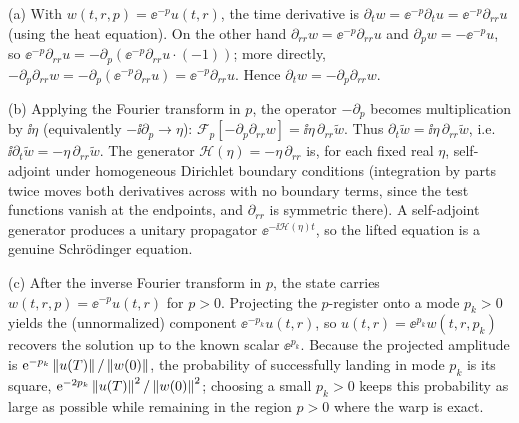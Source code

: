 \begin{solution}
(a) With $w(t,r,p)=\ee^{-p}u(t,r)$, the time derivative is $\partial_t w=\ee^{-p}\partial_t u
=\ee^{-p}\partial_{rr}u$ (using the heat equation). On the other hand $\partial_{rr}w=\ee^{-p}
\partial_{rr}u$ and $\partial_p w=-\ee^{-p}u$, so $\ee^{-p}\partial_{rr}u=-\partial_p(\ee^{-p}
\partial_{rr}u\cdot(-1))$; more directly, $-\partial_p\partial_{rr}w=-\partial_p(\ee^{-p}
\partial_{rr}u)=\ee^{-p}\partial_{rr}u$. Hence $\partial_t w=-\partial_p\partial_{rr}w$.

(b) Applying the Fourier transform in $p$, the operator $-\partial_p$ becomes multiplication by
$\ii\eta$ (equivalently $-\ii\partial_p\to\eta$): $\mathcal F_p[-\partial_p\partial_{rr}w]=
\ii\eta\,\partial_{rr}\tilde w$. Thus $\partial_t\tilde w=\ii\eta\,\partial_{rr}\tilde w$, i.e.\
$\ii\partial_t\tilde w=-\eta\,\partial_{rr}\tilde w$. The generator $\mathcal H(\eta)=-\eta\,
\partial_{rr}$ is, for each fixed real $\eta$, self-adjoint under homogeneous Dirichlet boundary
conditions (integration by parts twice moves both derivatives across with no boundary terms,
since the test functions vanish at the endpoints, and $\partial_{rr}$ is symmetric there). A
self-adjoint generator produces a unitary propagator $\ee^{-\ii\mathcal H(\eta)t}$, so the lifted
equation is a genuine Schr\"odinger equation.

(c) After the inverse Fourier transform in $p$, the state carries $w(t,r,p)=\ee^{-p}u(t,r)$ for
$p>0$. Projecting the $p$-register onto a mode $p_k>0$ yields the (unnormalized) component
$\ee^{-p_k}u(t,r)$, so $u(t,r)=\ee^{p_k}w(t,r,p_k)$ recovers the solution up to the known scalar
$\ee^{p_k}$. Because the projected amplitude is $\mathrm{e}^{-p_k}\left\lVert u(T) \right\rVert/\left\lVert w(0) \right\rVert$, the
probability of successfully landing in mode $p_k$ is its square,
$\mathrm{e}^{-2p_k}\left\lVert u(T) \right\rVert^2/\left\lVert w(0) \right\rVert^2$; choosing a small $p_k>0$ keeps this probability as
large as possible while remaining in the region $p>0$ where the warp is exact.
\end{solution}
